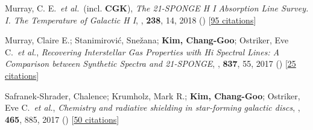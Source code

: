 \item[{3.}]Murray, C. E.~\textit{et al.}~(incl. \textbf{CGK}), \textit{The 21-SPONGE H I Absorption Line Survey. I. The Temperature of Galactic H I}, , \textbf{238}, 14, 2018 () [\href{http://adsabs.harvard.edu/abs/2018ApJS..238...14M}{95 citations}]

\item[{2.}]Murray, Claire E.; Stanimirovi{\'c}, Sne{\v{z}}ana; \textbf{Kim, Chang-Goo}; Ostriker, Eve C.~\textit{et al.}, \textit{Recovering Interstellar Gas Properties with Hi Spectral Lines: A Comparison between Synthetic Spectra and 21-SPONGE}, , \textbf{837}, 55, 2017 () [\href{http://adsabs.harvard.edu/abs/2017ApJ...837...55M}{25 citations}]

\item[{1.}]Safranek-Shrader, Chalence; Krumholz, Mark R.; \textbf{Kim, Chang-Goo}; Ostriker, Eve C.~\textit{et al.}, \textit{Chemistry and radiative shielding in star-forming galactic discs}, , \textbf{465}, 885, 2017 () [\href{http://adsabs.harvard.edu/abs/2017MNRAS.465..885S}{50 citations}]
